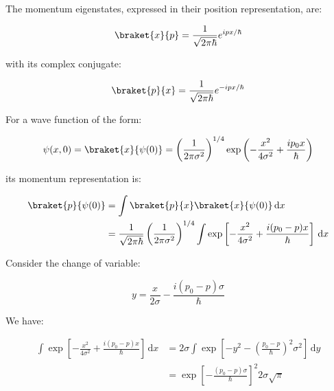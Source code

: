 \documentclass[12pt]{article}
\begin{document}
The momentum eigenstates, expressed in their position representation, are:

\begin{equation}
    \braket{x}{p} = \frac{1}{\sqrt{2\pi\hbar}} e^{ipx/\hbar}
\end{equation}

with its complex conjugate:

\begin{equation}
    \braket{p}{x} = \frac{1}{\sqrt{2\pi\hbar}} e^{-ipx/\hbar}
\end{equation}

For a wave function of the form:

\begin{equation}
    \psi(x, 0) = \braket{x}{\psi(0)} = \left( \frac{1}{2\pi \sigma^{2}} \right)^{1/4} \exp \left( -\frac{x^{2}}{4\sigma^{2}} + \frac{ip_{0}x}{\hbar} \right)
\end{equation}

its momentum representation is:

\begin{equation}
\begin{split}
    \braket{p}{\psi(0)} &= \int \braket{p}{x} \braket{x}{\psi(0)} \, \mathrm{d}x \\
    &= \frac{1}{\sqrt{2\pi\hbar}} \left( \frac{1}{2\pi \sigma^{2}} \right)^{1/4} \int \exp \left[ -\frac{x^{2}}{4\sigma^{2}} + \frac{i(p_{0} - p)x}{\hbar} \right] \, \mathrm{d}x \\
\end{split}
\end{equation}

Consider the change of variable:

\begin{equation}
    y = \frac{x}{2\sigma} - \frac{i(p_{0} - p)\sigma}{\hbar}
\end{equation}

We have:

\begin{equation}
\begin{split}
    \int \exp \left[ -\frac{x^{2}}{4\sigma^{2}} + \frac{i(p_{0} - p)x}{\hbar} \right] \, \mathrm{d}x &= 2\sigma \int \exp \left[ -y^{2} - \left( \frac{p_{0} - p}{\hbar} \right)^{2} \sigma^{2} \right] \, \mathrm{d}y \\
    &= \exp \left[ -\frac{(p_{0} - p)\sigma}{\hbar} \right]^{2} 2\sigma \sqrt{\pi}
\end{split}
\end{equation}
\end{document}
